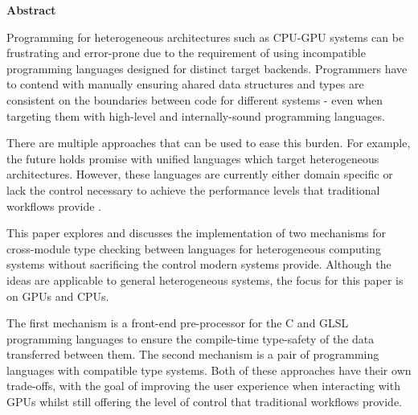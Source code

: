 \newpage
{\Huge \bf Abstract}
\vspace{24pt}






Programming for heterogeneous architectures such as CPU-GPU systems can be
frustrating and error-prone due to the requirement of using incompatible
programming languages designed for distinct target backends. Programmers have
to contend with manually ensuring ahared data structures and types are
consistent on the boundaries between code for different systems - even when
targeting them with high-level and internally-sound programming languages.

There are multiple approaches that can be used to ease this burden. For
example, the future holds promise with unified languages which target
heterogeneous architectures. However, these languages are currently either
domain specific \cite{DSL1} \cite{DSL2} or lack the control necessary to
achieve the performance levels that traditional workflows provide
\cite{Lime2010} \cite{JCUDA2009}.

This paper explores and discusses the implementation of two mechanisms for
cross-module type checking between languages for heterogeneous computing
systems without sacrificing the control modern systems provide. Although the
ideas are applicable to general heterogeneous systems, the focus for this paper
is on GPUs and CPUs.

The first mechanism is a front-end pre-processor for the C and GLSL programming
languages to ensure the compile-time type-safety of the data transferred
between them. The second mechanism is a pair of programming languages with
compatible type systems. Both of these approaches have their own trade-offs,
with the goal of improving the user experience when interacting with GPUs
whilst still offering the level of control that traditional workflows provide.

\newpage
\vspace*{\fill}
